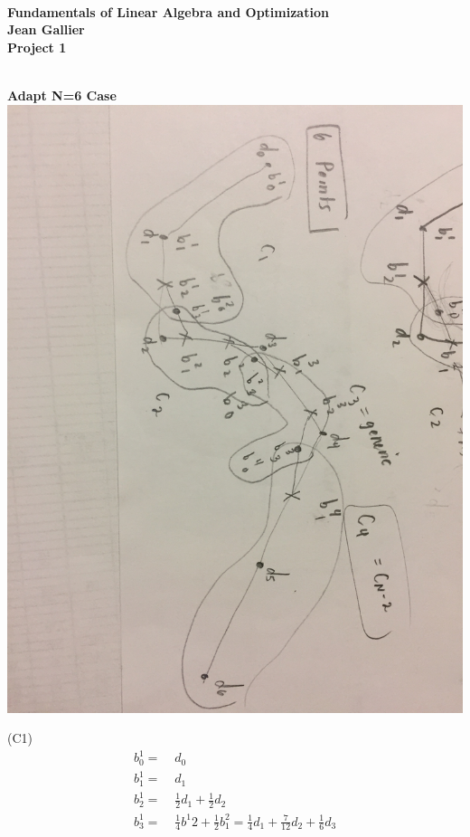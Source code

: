 \documentclass[12pt]{article}
\begin{document}
\begin{center}
\\
\vspace{1cm}
{\Large\bf Fundamentals of Linear Algebra and Optimization\\
Jean Gallier \\
\vspace{0.5cm}
Project 1}\\[10pt]
\end{center}

\\
\vspace {0.25cm}\noindent
{\bf Adapt N=6 Case} \\

\includegraphics[scale=.1]{6Points}

(C1)
\begin{align*}
b^{1}_{0} =&\; d_0 \\
b^{1}_{1} =&\; d_1 \\
b^{1}_{2} =&\; \frac{1}{2} d_1 + \frac{1}{2}d_2 \\
b^{1}_{3} =&\; \frac{1}{4} b^{1}{2} + \frac{1}{2} b^{2}_{1} =\frac{1}{4}d_1 +\frac{7}{12}d_2 + \frac{1}{6}d_3 \\
\end{align*}
\end{document}
